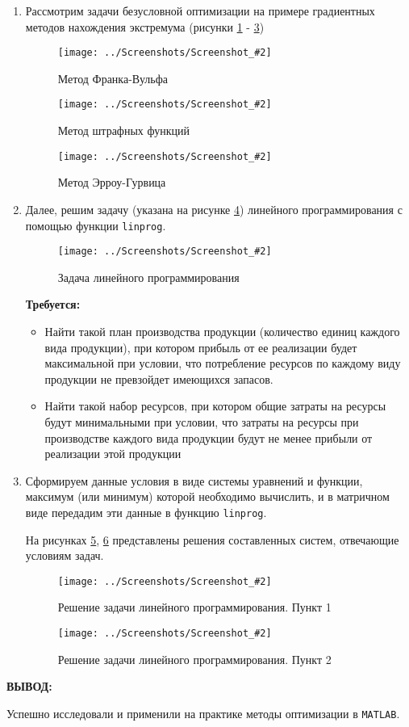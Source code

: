 \documentclass[14pt,a4paper]{extreport}
\newcommand{\sshot}[2]{\begin{figure}[ht]%
\centering\texttt{[image: ../Screenshots/Screenshot\_\#2]}%
\caption{#1}%
\label{sshot#2}%
\end{figure}%
}
\newcommand{\header}[1]{%
{
\clearpage%
\fontsize{16pt}{14pt}\selectfont
\begin{center}
\textbf{\MakeUppercase{#1}:}
\end{center}
}
}
\newcommand{\matlab}{\texttt{\MakeUppercase{matlab}}}
\begin{document}
\begin{enumerate}

\item Рассмотрим задачи безусловной оптимизации на примере градиентных методов нахождения экстремума (рисунки \ref{sshot1} - \ref{sshot3})

\sshot{Метод Франка-Вульфа}{1}
\sshot{Метод штрафных функций}{2}
\sshot{Метод Эрроу-Гурвица}{3}

\clearpage

\item Далее, решим задачу (указана на рисунке \ref{sshot6}) линейного программирования с помощью функции \texttt{linprog}.

\sshot{Задача линейного программирования}{6}

\textbf{Требуется:}

\begin{itemize}

\item Найти такой план производства продукции (количество единиц каждого вида продукции), при котором прибыль от ее реализации будет максимальной при условии, что потребление ресурсов по каждому виду продукции не превзойдет имеющихся запасов.

\item Найти такой набор ресурсов, при котором общие затраты на ресурсы будут минимальными при условии, что затраты на ресурсы при производстве каждого вида продукции будут не менее прибыли от реализации этой продукции 

\end{itemize}

\item Сформируем данные условия в виде системы уравнений и функции, максимум (или минимум) которой необходимо вычислить, и в матричном виде передадим эти данные в функцию \texttt{linprog}.

На рисунках \ref{sshot4}, \ref{sshot5} представлены решения составленных систем, отвечающие условиям задач.

\sshot{Решение задачи линейного программирования. Пункт 1}{4}
\sshot{Решение задачи линейного программирования. Пункт 2}{5}

\end{enumerate}

\header{Вывод}

Успешно исследовали и применили на практике методы оптимизации в \matlab .
\end{document}
